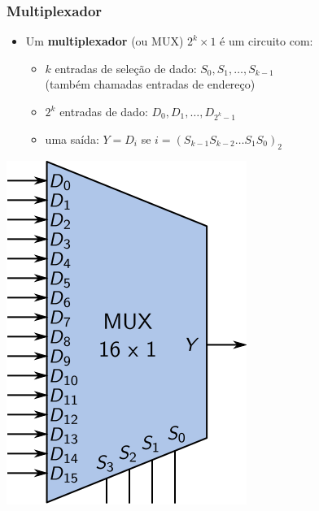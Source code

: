 \documentclass{beamer}
\begin{document}
\begin{frame}
\frametitle{Multiplexador}

\begin{itemize}
\item Um \textbf{multiplexador} (ou MUX) $2^k \times 1$ é um circuito
com:
\begin{itemize}
\item $k$ entradas de seleção de dado: $S_0, S_1, \ldots, S_{k-1}$\\
(também chamadas entradas de endereço)
\pause
\item $2^k$ entradas de dado: $D_0, D_1, \ldots, D_{2^k-1}$
\pause
\item uma saída: $Y = D_i$ se $i = (S_{k-1} S_{k-2} \ldots S_1 S_0)_2$
\end{itemize}
\end{itemize}
\pause
\begin{center}
\includegraphics[scale=0.9]{images/mux16x1}
\end{center}
\end{frame}
\end{document}
